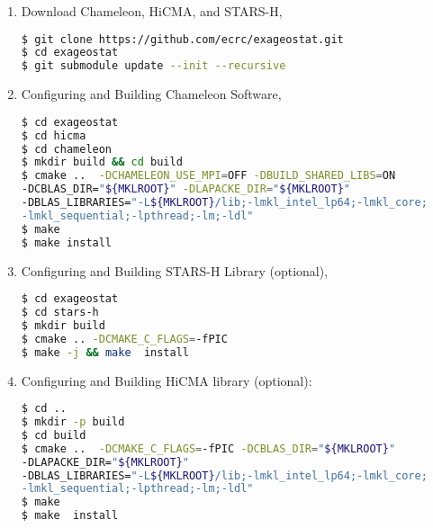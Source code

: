 \documentclass[
10pt, %
a4paper, %
oneside, %
headinclude,footinclude, %
BCOR5mm, %
]{scrartcl}
\begin{document}
\begin{enumerate}
%


\item
\noindent Download Chameleon, HiCMA, and STARS-H,
\begin{lstlisting}[language=bash]
$ git clone https://github.com/ecrc/exageostat.git
$ cd exageostat
$ git submodule update --init --recursive
\end{lstlisting}

\item
\noindent Configuring and Building Chameleon Software,
\begin{lstlisting}[language=bash]
$ cd exageostat
$ cd hicma
$ cd chameleon
$ mkdir build && cd build
$ cmake ..  -DCHAMELEON_USE_MPI=OFF -DBUILD_SHARED_LIBS=ON 
-DCBLAS_DIR="${MKLROOT}" -DLAPACKE_DIR="${MKLROOT}"
-DBLAS_LIBRARIES="-L${MKLROOT}/lib;-lmkl_intel_lp64;-lmkl_core; 
-lmkl_sequential;-lpthread;-lm;-ldl"
$ make 
$ make install
\end{lstlisting}


\item
\noindent Configuring and Building STARS-H Library (optional),
\begin{lstlisting}[language=bash]
$ cd exageostat
$ cd stars-h
$ mkdir build 
$ cmake .. -DCMAKE_C_FLAGS=-fPIC 
$ make -j && make  install
\end{lstlisting}



\item
\noindent Configuring and Building HiCMA library (optional):
\begin{lstlisting}[language=bash]
$ cd ..
$ mkdir -p build
$ cd build
$ cmake ..  -DCMAKE_C_FLAGS=-fPIC -DCBLAS_DIR="${MKLROOT}" 
-DLAPACKE_DIR="${MKLROOT}"
-DBLAS_LIBRARIES="-L${MKLROOT}/lib;-lmkl_intel_lp64;-lmkl_core;
-lmkl_sequential;-lpthread;-lm;-ldl"
$ make 
$ make  install
\end{lstlisting}
\end{enumerate}
\end{document}
